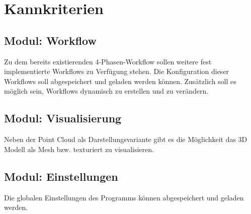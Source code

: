 \section{Kannkriterien}
\subsection{Modul: Workflow}
Zu dem bereits existierenden 4-Phasen-Workflow sollen weitere fest implementierte Workflows zu Verfügung stehen. Die Konfiguration dieser Workflows soll abgespeichert und geladen werden können. Zusätzlich soll es möglich sein, Workflows dynamisch zu erstellen und zu verändern. 
\subsection{Modul: Visualisierung}
Neben der Point Cloud als Darstellungsvariante gibt es die Möglichkeit das 3D Modell als Mesh bzw. texturiert zu visualisieren.
\subsection{Modul: Einstellungen}
Die globalen Einstellungen des Programms können abgespeichert und geladen werden.
